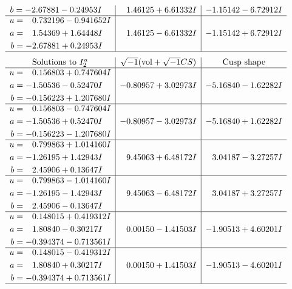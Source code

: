 \documentclass[1p]{elsarticle_modified}
\theoremstyle{definition}
\newcommand{\I}{\sqrt{-1}}
\begin{document}
$$\begin{array}{c|c|c}
\begin{aligned}
b &= -2.67881 - 0.24953 I\end{aligned}
 & \phantom{-}1.46125 + 6.61332 I & -1.15142 - 6.72912 I \\ \hline\begin{aligned}
u &= \phantom{-}0.732196 - 0.941652 I \\
a &= \phantom{-}1.54369 + 1.64448 I \\
b &= -2.67881 + 0.24953 I\end{aligned}
 & \phantom{-}1.46125 - 6.61332 I & -1.15142 + 6.72912 I\\
 \hline 
 \end{array}$$\newpage$$\begin{array}{c|c|c}  
\text{Solutions to }I^u_{2}& \I (\text{vol} + \sqrt{-1}CS) & \text{Cusp shape}\\
 \hline 
\begin{aligned}
u &= \phantom{-}0.156803 + 0.747604 I \\
a &= -1.50536 - 0.52470 I \\
b &= -0.156223 + 1.207680 I\end{aligned}
 & -0.80957 + 3.02973 I & -5.16840 - 1.62282 I \\ \hline\begin{aligned}
u &= \phantom{-}0.156803 - 0.747604 I \\
a &= -1.50536 + 0.52470 I \\
b &= -0.156223 - 1.207680 I\end{aligned}
 & -0.80957 - 3.02973 I & -5.16840 + 1.62282 I \\ \hline\begin{aligned}
u &= \phantom{-}0.799863 + 1.014160 I \\
a &= -1.26195 + 1.42943 I \\
b &= \phantom{-}2.45906 + 0.13647 I\end{aligned}
 & \phantom{-}9.45063 + 6.48172 I & \phantom{-}3.04187 - 3.27257 I \\ \hline\begin{aligned}
u &= \phantom{-}0.799863 - 1.014160 I \\
a &= -1.26195 - 1.42943 I \\
b &= \phantom{-}2.45906 - 0.13647 I\end{aligned}
 & \phantom{-}9.45063 - 6.48172 I & \phantom{-}3.04187 + 3.27257 I \\ \hline\begin{aligned}
u &= \phantom{-}0.148015 + 0.419312 I \\
a &= \phantom{-}1.80840 - 0.30217 I \\
b &= -0.394374 - 0.713561 I\end{aligned}
 & \phantom{-}0.00150 - 1.41503 I & -1.90513 + 4.60201 I \\ \hline\begin{aligned}
u &= \phantom{-}0.148015 - 0.419312 I \\
a &= \phantom{-}1.80840 + 0.30217 I \\
b &= -0.394374 + 0.713561 I\end{aligned}
 & \phantom{-}0.00150 + 1.41503 I & -1.90513 - 4.60201 I\\
 \hline 
 \end{array}$$\newpage\newpage\renewcommand{\arraystretch}{1}
\end{document}
